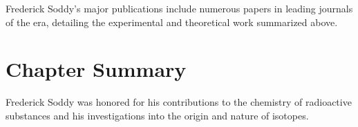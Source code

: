 Frederick Soddy's major publications include numerous papers in leading journals of the era, detailing the experimental and theoretical work summarized above.

\clearpage

\section*{Chapter Summary}

Frederick Soddy was honored for his contributions to the chemistry of radioactive substances and his investigations into the origin and nature of isotopes.
